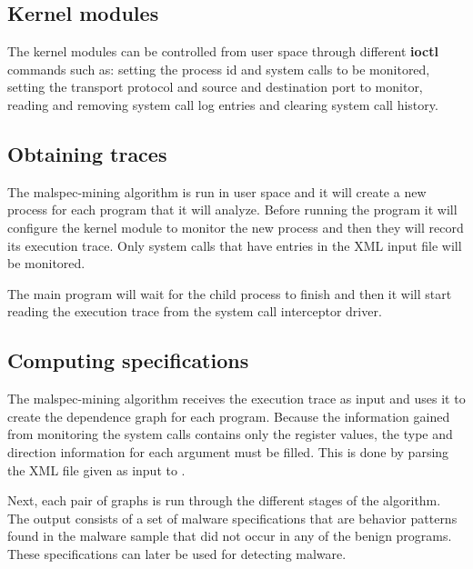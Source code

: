 
\subsection{Kernel modules}

The kernel modules can be controlled from user space through different \textbf{ioctl} commands such as: setting the process id and system calls to be monitored, setting the transport protocol and source and destination port to monitor, reading and removing system call log entries and clearing system call
history.

\subsection{Obtaining traces}

The malspec-mining algorithm is run in user space and it will create a new process for each program that it will analyze. Before running the program it will configure the kernel module to monitor the new process and then they will record its execution trace. Only system calls that have entries in the XML input file will be monitored.

The main program will wait for the child process to finish and then it will start reading the execution trace from the system call interceptor driver.

\subsection{Computing specifications}
 
The malspec-mining algorithm receives the execution trace as input and uses it to create the dependence graph for each program. Because the information gained from monitoring the system calls contains only the register values, the type and direction information for each argument must be filled. This is done by parsing the XML file given as input to \project.

Next, each pair of graphs is run through the different stages of the algorithm. The output consists of a set of malware specifications that are behavior patterns found in the malware sample that did not occur in any of the benign programs. These specifications can later be used for detecting malware.
